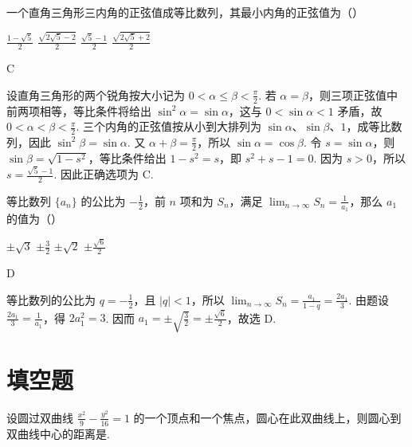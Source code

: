 \begin{problem}
一个直角三角形三内角的正弦值成等比数列，其最小内角的正弦值为（\quad）

\choices
    {\(\frac{1-\sqrt{5}}{2}\)}
    {\(\frac{\sqrt{2\sqrt{5}-2}}{2}\)}
    {\(\frac{\sqrt{5}-1}{2}\)}
    {\(\frac{\sqrt{2\sqrt{5}+2}}{2}\)}
\end{problem}

\begin{answer}
C
\end{answer}

\begin{solution}
设直角三角形的两个锐角按大小记为 \(0<\alpha\leqslant\beta<\frac{\pi}{2}\). 若 \(\alpha=\beta\)，则三项正弦值中前两项相等，等比条件将给出 \(\sin^2\alpha=\sin\alpha\)，这与 \(0<\sin\alpha<1\) 矛盾，故 \(0<\alpha<\beta<\frac{\pi}{2}\). 三个内角的正弦值按从小到大排列为 \(\sin\alpha\)、\(\sin\beta\)、\(1\)，成等比数列，因此 \(\sin^2\beta=\sin\alpha\). 又 \(\alpha+\beta=\frac{\pi}{2}\)，所以 \(\sin\alpha=\cos\beta\). 令 \(s=\sin\alpha\)，则 \(\sin\beta=\sqrt{1-s^2}\)，等比条件给出 \(1-s^2=s\)，即 \(s^2+s-1=0\). 因为 \(s>0\)，所以 \(s=\frac{\sqrt{5}-1}{2}\). 因此正确选项为 C.
\end{solution}

\begin{problem}
等比数列 \(\{a_{n}\}\) 的公比为 \(-\frac{1}{2}\)，前 \(n\) 项和为 \(S_{n}\)，满足 \(\displaystyle\lim_{n\to \infty} S_n = \frac{1}{a_1}\)，那么 \(a_1\) 的值为（\quad）

\choices
    {\(\pm \sqrt{3}\)}
    {\(\pm \frac{3}{2}\)}
    {\(\pm\sqrt{2}\)}
    {\(\pm \frac{\sqrt{6}}{2}\)}
\end{problem}

\begin{answer}
D
\end{answer}

\begin{solution}
等比数列的公比为 \(q=-\frac{1}{2}\)，且 \(|q|<1\)，所以
\(\displaystyle\lim_{n\to\infty}S_n=\frac{a_1}{1-q}=\frac{2a_1}{3}\). 由题设
\(\frac{2a_1}{3}=\frac{1}{a_1}\)，得 \(2a_1^2=3\). 因而
\(a_1=\pm\sqrt{\frac{3}{2}}=\pm\frac{\sqrt{6}}{2}\)，故选 D.
\end{solution}

\section{填空题}

\begin{problem}
设圆过双曲线 \(\frac{x^{2}}{9} - \frac{y^{2}}{16} = 1\) 的一个顶点和一个焦点，圆心在此双曲线上，则圆心到双曲线中心的距离是\fillinblank{}.
\end{problem}

